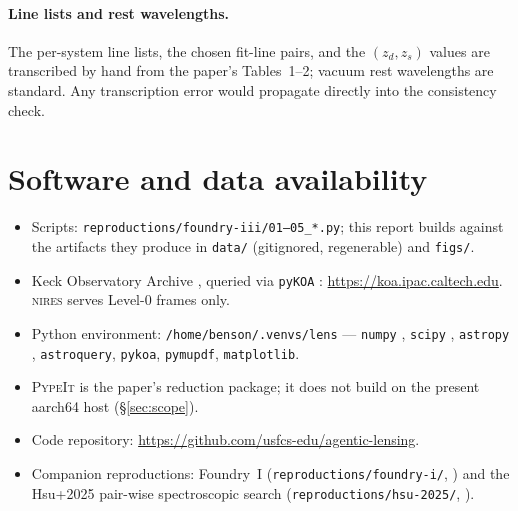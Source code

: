 \documentclass[11pt,letterpaper]{article}
\newcommand{\zs}{\ensuremath{z_s}}
\newcommand{\zd}{\ensuremath{z_d}}
\newcommand{\NIRES}{\textsc{nires}}
\begin{document}
\paragraph{Line lists and rest wavelengths.} The per-system line lists,
the chosen fit-line pairs, and the $(\zd, \zs)$ values are transcribed by
hand from the paper's Tables~1--2; vacuum rest wavelengths are standard.
Any transcription error would propagate directly into the consistency
check.

\section{Software and data availability}

\begin{itemize}
\item Scripts: \texttt{reproductions/foundry-iii/01--05\_*.py}; this
      report builds against the artifacts they produce in
      \texttt{data/} (gitignored, regenerable) and \texttt{figs/}.
\item Keck Observatory Archive \citep{koa}, queried via \texttt{pyKOA}
      \citep{pykoa}: \url{https://koa.ipac.caltech.edu}. \NIRES{} serves
      Level-0 frames only.
\item Python environment: \texttt{/home/benson/.venvs/lens} ---
      \texttt{numpy} \citep{harris2020numpy}, \texttt{scipy}
      \citep{virtanen2020scipy}, \texttt{astropy} \citep{astropy2022},
      \texttt{astroquery}, \texttt{pykoa}, \texttt{pymupdf},
      \texttt{matplotlib}.
\item \textsc{PypeIt} \citep{prochaska2020pypeit,prochaska2020pypeit_zenodo}
      is the paper's reduction package; it does not build on the present
      aarch64 host (\S\ref{sec:scope}).
\item Code repository: \url{https://github.com/usfcs-edu/agentic-lensing}.
\item Companion reproductions: Foundry~I
      (\texttt{reproductions/foundry-i/}, \citealt{huang2025foundry1}) and
      the Hsu+2025 pair-wise spectroscopic search
      (\texttt{reproductions/hsu-2025/}, \citealt{hsu2025pairwise}).
\end{itemize}

\end{document}
